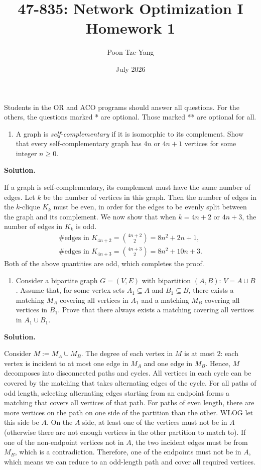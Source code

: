 \documentclass[11pt,letterpaper]{article}
\title{47-835: Network Optimization I \\ Homework 1}
\author{Poon Tze-Yang}
\date{July 2026}
\theoremstyle{definition}
\newcommand{\solution}{\medskip\noindent\textbf{Solution.}\par\medskip}
\begin{document}
\maketitle

Students in the OR and ACO programs should answer all questions. For the others, the questions marked * are optional. Those marked ** are optional for all.

\begin{enumerate}
\item A graph is \emph{self-complementary} if it is isomorphic to its complement. Show that every self-complementary graph has $4n$ or $4n+1$ vertices for some integer $n \geq 0$.
\end{enumerate}

\solution
If a graph is self-complementary, its complement must have the same number of edges.
Let $k$ be the number of vertices in this graph.
Then the number of edges in the $k$-clique $K_k$ must be even, in order for the edges to be evenly split between the graph and its complement.
We now show that when $k=4n+2$ or $4n+3$, the number of edges in $K_k$ is odd.
\begin{align*}
    \text{\#edges in }K_{4n+2} = \binom{4n+2}{2} = 8n^2+2n+1, \\
    \text{\#edges in }K_{4n+3} = \binom{4n+3}{2} = 8n^2+10n+3. 
\end{align*}
Both of the above quantities are odd, which completes the proof.

\begin{enumerate}[resume]
\item Consider a bipartite graph $G = (V,E)$ with bipartition $(A,B)$: $V = A \cup B$. Assume that, for some vertex sets $A_1 \subseteq A$ and $B_1 \subseteq B$, there exists a matching $M_A$ covering all vertices in $A_1$ and a matching $M_B$ covering all vertices in $B_1$. Prove that there always exists a matching covering all vertices in $A_1 \cup B_1$.
\end{enumerate}

\solution
Consider $M:=M_A\cup M_B$. 
The degree of each vertex in $M$ is at most $2$: each vertex is incident to at most one edge in $M_A$ and one edge in $M_B$.
Hence, $M$ decomposes into disconnected paths and cycles. 
All vertices in each cycle can be covered by the matching that takes alternating edges of the cycle.
For all paths of odd length, selecting alternating edges starting from an endpoint forms a matching that covers all vertices of that path.
For paths of even length, there are more vertices on the path on one side of the partition than the other.
WLOG let this side be $A$. 
On the $A$ side, at least one of the vertices must not be in $A$ (otherwise there are not enough vertices in the other partition to match to).
If one of the non-endpoint vertices not in $A$, the two incident edges must be from $M_B$, which is a contradiction.
Therefore, one of the endpoints must not be in $A$, which means we can reduce to an odd-length path and cover all required vertices.
\end{document}
